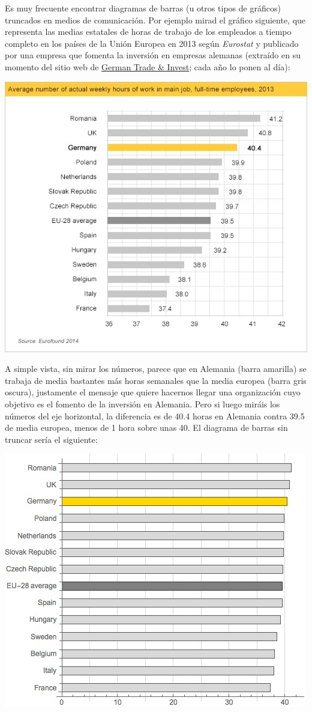 \documentclass[
]{book}
\theoremstyle{definition}
\theoremstyle{definition}
\theoremstyle{definition}
\theoremstyle{definition}
\theoremstyle{remark}
\begin{document}
Es muy frecuente encontrar diagramas de barras (u otros tipos de gráficos) truncados en medios de comunicación. Por ejemplo mirad el gráfico siguiente, que representa las medias estatales de horas de trabajo de los empleados a tiempo completo en los países de la Unión Europea en 2013 según \emph{Eurostat} y publicado por una empresa que fomenta la inversión en empresas alemanas (extraído en su momento del sitio web de \href{https://www.gtai.de/GTAI/Navigation/EN/invest,t=motivated-and-dependable-employees,did=214428.html}{German Trade \& Invest}; cada año lo ponen al día):

\begin{center}\includegraphics[width=0.75\linewidth]{INREMDN_files/figure-html/german1} \end{center}

A simple vista, sin mirar los números, parece que en Alemania (barra amarilla) se trabaja de media bastantes más horas semanales que la media europea (barra gris oscura), justamente el mensaje que quiere hacernos llegar una organización cuyo objetivo es el fomento de la inversión en Alemania. Pero si luego miráis los números del eje horizontal, la diferencia es de 40.4 horas en Alemania contra 39.5 de media europea, menos de 1 hora sobre unas 40. El diagrama de barras sin truncar sería el siguiente:

\begin{center}\includegraphics[width=0.75\linewidth]{INREMDN_files/figure-html/german2} \end{center}
\end{document}
